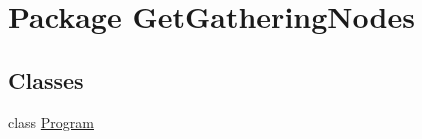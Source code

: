 \hypertarget{namespace_get_gathering_nodes}{\section{Package Get\-Gathering\-Nodes}
\label{namespace_get_gathering_nodes}
}
\subsection*{Classes}
\begin{DoxyCompactItemize}
\item 
class \hyperlink{class_get_gathering_nodes_1_1_program}{Program}
\end{DoxyCompactItemize}
